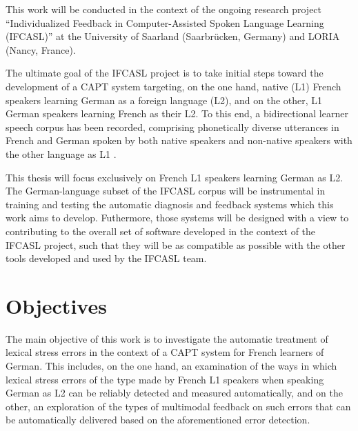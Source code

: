This work will be conducted in the context of the ongoing research project ``Individualized Feedback in Computer-Assisted Spoken Language Learning (IFCASL)'' at the University of Saarland (Saarbrücken, Germany) and LORIA (Nancy, France). 

The ultimate goal of the IFCASL project is to take initial steps toward the development of a CAPT system targeting, on the one hand, native (L1) French speakers learning German as a foreign language (L2), and on the other, L1 German speakers learning French as their L2. To this end, a bidirectional learner speech corpus has been recorded, comprising phonetically diverse utterances in French and German spoken by both native speakers and non-native speakers with the other language as L1 \citep{Fauth2014,Trouvain2013}.  

This thesis will focus exclusively on French L1 speakers learning German as L2. The German-language subset of the IFCASL corpus will be instrumental in training and testing the automatic diagnosis and feedback systems which this work aims to develop. Futhermore, those systems will be designed with a view to contributing to the overall set of software developed in the context of the IFCASL project, such that they will be as compatible as possible with the other tools developed and used by the IFCASL team. %


\section{Objectives}
\label{sec:intro:objectives}


The main objective of this work is to investigate the automatic treatment of lexical stress errors in the context of a CAPT system for French learners of German. This includes, on the one hand, an examination of the ways in which lexical stress errors of the type made by French L1 speakers when speaking German as L2 can be reliably detected and measured %
automatically, and on the other, an exploration of the types of multimodal feedback on such errors that can be automatically delivered based on the aforementioned error detection. 


